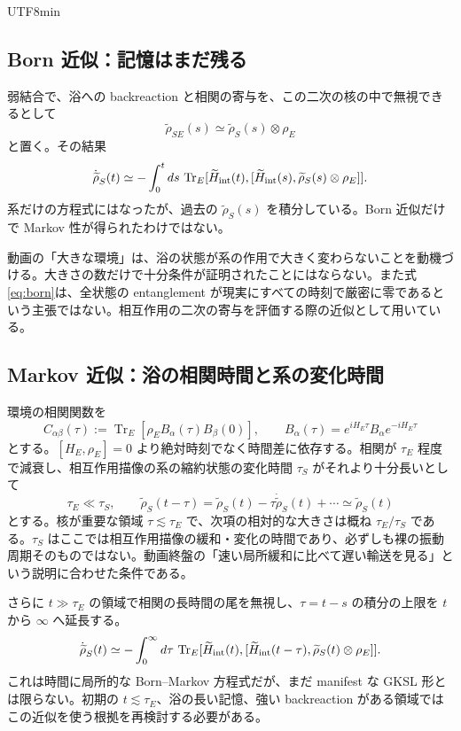 \documentclass[11pt,a4paper]{article}
\numberwithin{equation}{section}
\newcommand{\Tr}{\operatorname{Tr}}
\begin{document}
\begin{CJK*}{UTF8}{min}
\subsection{Born 近似：記憶はまだ残る}
弱結合で、浴への backreaction と相関の寄与を、この二次の核の中で無視できるとして
\begin{equation}
\widetilde\rho_{SE}(s)\simeq
\widetilde\rho_S(s)\otimes\rho_E
\label{eq:born}
\end{equation}
と置く。その結果
\begin{equation}
\dot{\widetilde\rho}_S(t)\simeq
-\int_0^t ds\,\Tr_E
[\widetilde H_{\rm int}(t),
[\widetilde H_{\rm int}(s),\widetilde\rho_S(s)\otimes\rho_E]].
\label{eq:bornmemory}
\end{equation}
系だけの方程式にはなったが、過去の $\widetilde\rho_S(s)$ を積分している。Born 近似だけで Markov 性が得られたわけではない。

動画の「大きな環境」は、浴の状態が系の作用で大きく変わらないことを動機づける。大きさの数だけで十分条件が証明されたことにはならない。また式\eqref{eq:born}は、全状態の entanglement が現実にすべての時刻で厳密に零であるという主張ではない。相互作用の二次の寄与を評価する際の近似として用いている。

\subsection{Markov 近似：浴の相関時間と系の変化時間}
環境の相関関数を
\begin{equation}
C_{\alpha\beta}(\tau):=\Tr_E[\rho_E B_\alpha(\tau)B_\beta(0)],
\qquad B_\alpha(\tau)=e^{iH_E\tau}B_\alpha e^{-iH_E\tau}
\label{eq:bathcorrelator}
\end{equation}
とする。$[H_E,\rho_E]=0$ より絶対時刻でなく時間差に依存する。相関が $\tau_E$ 程度で減衰し、相互作用描像の系の縮約状態の変化時間 $\tau_S$ がそれより十分長いとして
\begin{equation}
\tau_E\ll\tau_S,\qquad
\widetilde\rho_S(t-\tau)
=\widetilde\rho_S(t)-\tau\dot{\widetilde\rho}_S(t)+\cdots
\simeq\widetilde\rho_S(t)
\label{eq:markovscale}
\end{equation}
とする。核が重要な領域 $\tau\lesssim\tau_E$ で、次項の相対的な大きさは概ね $\tau_E/\tau_S$ である。$\tau_S$ はここでは相互作用描像の緩和・変化の時間であり、必ずしも裸の振動周期そのものではない。動画終盤の「速い局所緩和に比べて遅い輸送を見る」という説明に合わせた条件である。

さらに $t\gg\tau_E$ の領域で相関の長時間の尾を無視し、$\tau=t-s$ の積分の上限を $t$ から $\infty$ へ延長する。
\begin{equation}
\dot{\widetilde\rho}_S(t)\simeq-
\int_0^\infty d\tau\,\Tr_E
[\widetilde H_{\rm int}(t),
[\widetilde H_{\rm int}(t-\tau),\widetilde\rho_S(t)\otimes\rho_E]].
\label{eq:bornmarkov}
\end{equation}
これは時間に局所的な Born--Markov 方程式だが、まだ manifest な GKSL 形とは限らない。初期の $t\lesssim\tau_E$、浴の長い記憶、強い backreaction がある領域ではこの近似を使う根拠を再検討する必要がある。


\end{CJK*}
\end{document}

